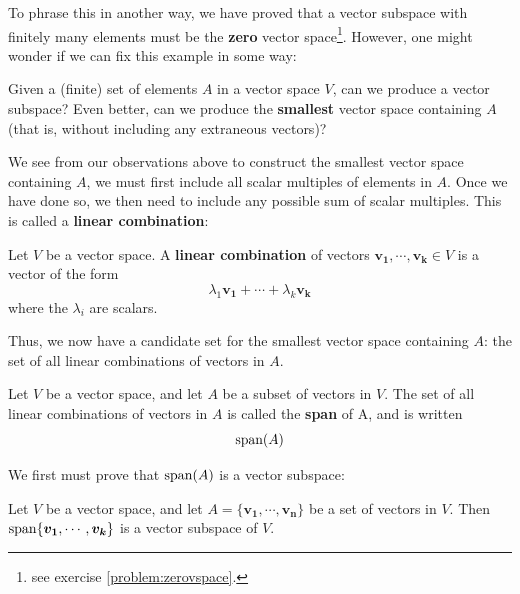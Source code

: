     
        


    

    To phrase this in another way, we have proved that a vector subspace with finitely many elements must be the \textbf{zero} vector space\footnote{ see exercise \ref{problem:zerovspace}.}.  However, one might wonder if we can fix this example in some way:

    \begin{motivating}
      Given a (finite) set of elements $A$ in a vector space $V$, can we produce a vector subspace?  Even better, can we produce the \textbf{smallest} vector space containing $A$ (that is, without including any extraneous vectors)?
    \end{motivating}
    
    We see from our observations above to construct the smallest vector space containing $A$, we must first include all scalar multiples of elements in $A$.  Once we have done so, we then need to include any possible sum of scalar multiples.  This is called a \textbf{linear combination}:
    
    \begin{definition}
    Let $V$ be a vector space.  A \textbf{linear combination} of vectors $\bm{v_1}, \cdots, \bm{v_k} \in V$ is a vector of the form 
    $$\lambda_1\bm{v_1} + \cdots + \lambda_k\bm{v_k}$$ where the $\lambda_i$ are scalars.
    \end{definition}

    
    Thus, we now have a candidate set for the smallest vector space containing $A$:  the set of all linear combinations of vectors in $A$.
    
    \begin{definition}
    Let $V$ be a vector space, and let $A$ be a subset of vectors in $V$.  The set of all linear combinations of vectors in $A$ is called the \textbf{span} of A, and is written
    $$\textnormal{span}(A)$$
     
\end{definition}
    
    We first must prove that $\textnormal{span}(A)$ is a vector subspace:
    
    \begin{theorem}
    Let $V$ be a vector space, and let $A = \{\bm{v_1}, \cdots, \bm{v_n}\}$ be a set of vectors in $V$.  Then $\textnormal{span}\{\bm{v_1}, \cdots, \bm{v_k}\}$ is a vector subspace of $V$.
    \end{theorem}
    
